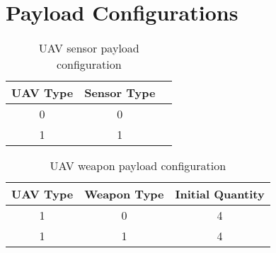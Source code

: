 \chapter{Payload Configurations}
\label{sec:pyldConfigs}
\begin{table}[H]
	\caption{UAV sensor payload configuration}
	\centering
	\label{tab:uavSensorMap}
	\begin{tabular}{ccc}
		\hline
		UAV Type & Sensor Type\\ \hline
		0 & 0 \\
		1 & 1 \\ \hline
	\end{tabular}
\end{table}

\begin{table}[H]
	\caption{UAV weapon payload configuration}
	\centering
	\label{tab:uavWpnMap}
	\begin{tabular}{c c c}
		\hline
		UAV Type & Weapon Type & Initial Quantity\\ \hline
		1 & 0 & 4 \\
		1 & 1 & 4 \\ \hline
	\end{tabular}
\end{table}